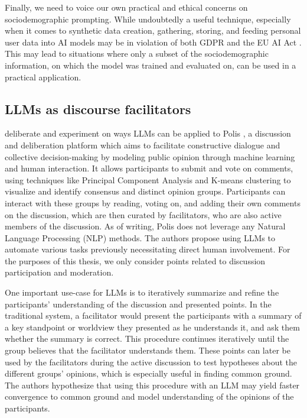 Finally, we need to voice our own practical and ethical concerns on sociodemographic prompting. While undoubtedly a useful technique, especially when it comes to synthetic data creation, gathering, storing, and feeding personal user data into AI models may be in violation of both GDPR \cite{gdpr} and the EU AI Act \cite{eu_ai_act_2021}. This may lead to situations where only a subset of the sociodemographic information, on which the model was trained and evaluated on, can be used in a practical application.


\subsection{LLMs as discourse facilitators}
\label{sec:related:discource}

\cite{small-polis-llm} deliberate and experiment on ways LLMs can be applied to Polis \cite{small2021polis}, a discussion and deliberation platform which aims to facilitate constructive dialogue and collective decision-making by modeling public opinion through machine learning and human interaction. It allows participants to submit and vote on comments, using techniques like Principal Component Analysis and K-means clustering to visualize and identify consensus and distinct opinion groups. Participants can interact with these groups by reading, voting on, and adding their own comments on the discussion, which are then curated by facilitators, who are also active members of the discussion. As of writing, Polis does not leverage any Natural Language Processing (NLP) methods. The authors propose using LLMs to automate various tasks previously necessitating direct human involvement. For the purposes of this thesis, we only consider points related to discussion participation and moderation. 

One important use-case for LLMs is to iteratively summarize and refine the participants' understanding of the discussion and presented points. In the traditional system, a facilitator would present the participants with a summary of a key standpoint or worldview they presented as he understands it, and ask them whether the summary is correct. This procedure continues iteratively until the group believes that the facilitator understands them. These points can later be used by the facilitators during the active discussion to test hypotheses about the different groups' opinions, which is especially useful in finding common ground. The authors hypothesize that using this procedure with an LLM may yield faster convergence to common ground and model understanding of the opinions of the participants.

